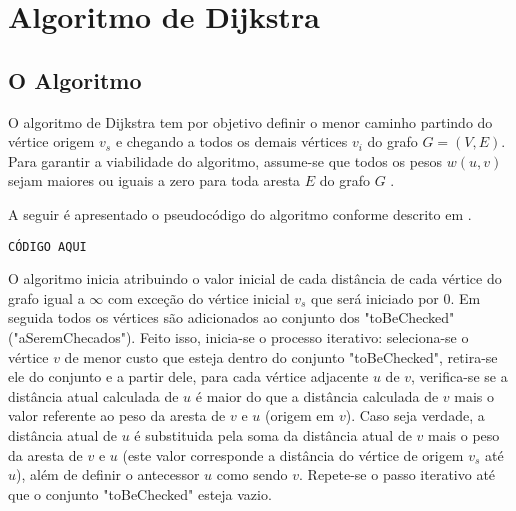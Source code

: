 \chapter{Algoritmo de Dijkstra}
\label{sec-dijkstra}

\section{O Algoritmo}
\label{sec-dijkstra-algoritmo}
O algoritmo de Dijkstra tem por objetivo definir o menor caminho partindo do vértice origem $v_{s}$ e chegando a todos os demais vértices $v_{i}$ do grafo $G = (V,E)$. Para garantir a viabilidade do algoritmo, assume-se que todos os pesos $w( u, v )$ sejam maiores ou iguais a zero para toda aresta $E$ do grafo $G$ \cite{cormen2009introduction}.

A seguir é apresentado o pseudocódigo do algoritmo conforme descrito em .
\begin{verbatim}
CÓDIGO AQUI
\end{verbatim}

O algoritmo inicia atribuindo o valor inicial de cada distância de cada vértice do grafo igual a $\infty$ com exceção do vértice inicial $v_{s}$ que será iniciado por 0. Em seguida todos os vértices são adicionados ao conjunto dos "toBeChecked" ("aSeremChecados"). Feito isso, inicia-se o processo iterativo: seleciona-se o vértice $v$ de menor custo que esteja dentro do conjunto "toBeChecked", retira-se ele do conjunto e a partir dele, para cada vértice adjacente $u$ de $v$, verifica-se se a distância atual calculada de $u$ é maior do que a distância calculada de $v$ mais o valor referente ao peso da aresta de $v$ e $u$ (origem em $v$). Caso seja verdade, a distância atual de $u$ é substituida pela soma da distância atual de $v$ mais o peso da aresta de $v$ e $u$ (este valor corresponde a distância do vértice de origem $v_{s}$ até $u$), além de definir o antecessor $u$ como sendo $v$. Repete-se o passo iterativo até que o conjunto "toBeChecked" esteja vazio.


